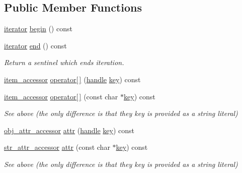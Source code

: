 \subsection*{Public Member Functions}
\begin{DoxyCompactItemize}
\item 
\mbox{\hyperlink{classiterator}{iterator}} \mbox{\hyperlink{classobject__api_a18ff315942ef1238c6c9d28c0ef9301f}{begin}} () const
\item 
\mbox{\hyperlink{classiterator}{iterator}} \mbox{\hyperlink{classobject__api_a67b1b3d151adc273eeda39837e63f581}{end}} () const
\begin{DoxyCompactList}\small\item\em Return a sentinel which ends iteration. \end{DoxyCompactList}\item 
\mbox{\hyperlink{pytypes_8h_a9907d3edf962653e33d36bccc8b8a268}{item\+\_\+accessor}} \mbox{\hyperlink{classobject__api_a22a02d920a489c385a2502802e547943}{operator\mbox{[}$\,$\mbox{]}}} (\mbox{\hyperlink{classhandle}{handle}} \mbox{\hyperlink{setobject_8h_ab06f52e01abcbec81a27c56570d3c10b}{key}}) const
\item 
\mbox{\hyperlink{pytypes_8h_a9907d3edf962653e33d36bccc8b8a268}{item\+\_\+accessor}} \mbox{\hyperlink{classobject__api_a81277a47b87a2a79f216895d7a5018a8}{operator\mbox{[}$\,$\mbox{]}}} (const char $\ast$\mbox{\hyperlink{setobject_8h_ab06f52e01abcbec81a27c56570d3c10b}{key}}) const
\begin{DoxyCompactList}\small\item\em See above (the only difference is that they key is provided as a string literal) \end{DoxyCompactList}\item 
\mbox{\hyperlink{pytypes_8h_a709d3bd7fb7de203660aadcee497f975}{obj\+\_\+attr\+\_\+accessor}} \mbox{\hyperlink{classobject__api_a17b39579263007abe74cfbf80015ebd9}{attr}} (\mbox{\hyperlink{classhandle}{handle}} \mbox{\hyperlink{setobject_8h_ab06f52e01abcbec81a27c56570d3c10b}{key}}) const
\item 
\mbox{\hyperlink{pytypes_8h_a3e386ad6d0167a1022046e78dc281efd}{str\+\_\+attr\+\_\+accessor}} \mbox{\hyperlink{classobject__api_ae5a18d371ec699cd68561d78503b493f}{attr}} (const char $\ast$\mbox{\hyperlink{setobject_8h_ab06f52e01abcbec81a27c56570d3c10b}{key}}) const
\begin{DoxyCompactList}\small\item\em See above (the only difference is that they key is provided as a string literal) \end{DoxyCompactList}\item 

\end{DoxyCompactItemize}
